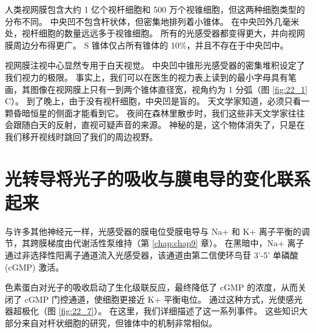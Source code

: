 人类视网膜包含大约 1 亿个视杆细胞和 500 万个视锥细胞，但这两种细胞类型的分布不同。 
中央凹不包含杆状体，但密集地排列着小锥体。 
在中央凹外几毫米处，视杆细胞的数量远远多于视锥细胞。 
所有的光感受器都变得更大，并向视网膜周边分布得更广。 
S 锥体仅占所有锥体的 10\%，并且不存在于中央凹中。


视网膜注视中心显然专用于白天视觉。 
中央凹中锥形光感受器的密集堆积设定了我们视力的极限。 
事实上，我们可以在医生的视力表上读到的最小字母具有笔画，其图像在视网膜上只有一到两个锥体直径宽，视角约为 1 分弧（图 \ref{fig:22_1} C）。 
到了晚上，由于没有视杆细胞，中央凹是盲的。 
天文学家知道，必须只看一颗昏暗恒星的侧面才能看到它。 
夜间在森林里散步时，我们这些非天文学家往往会跟随白天的反射，直视可疑声音的来源。 
神秘的是，这个物体消失了，只是在我们移开视线时跳回了我们的周边视野。


\section{光转导将光子的吸收与膜电导的变化联系起来}
与许多其他神经元一样，光感受器的膜电位受膜电导与 Na+ 和 K+ 离子平衡的调节，其跨膜梯度由代谢活性泵维持（第 \ref{chap:chap9} 章）。 
在黑暗中，Na+ 离子通过非选择性阳离子通道流入光感受器，该通道由第二信使环鸟苷 3'-5' 单磷酸 (cGMP) 激活。


色素蛋白对光子的吸收启动了生化级联反应，最终降低了 cGMP 的浓度，从而关闭了 cGMP 门控通道，使细胞更接近 K+ 平衡电位。 
通过这种方式，光使感光器超极化（图 \ref{fig:22_7}）。 
在这里，我们详细描述了这一系列事件。 这些知识大部分来自对杆状细胞的研究，但锥体中的机制非常相似。

